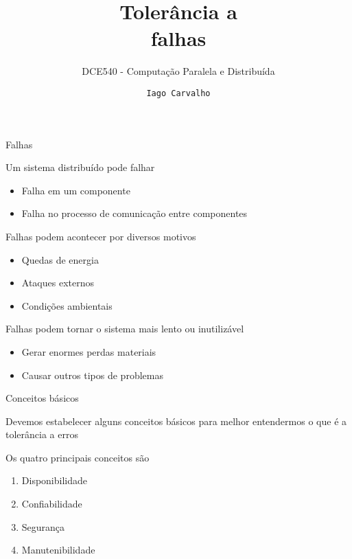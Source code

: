 \documentclass[compress]{beamer}
\title{Tolerância a \\ falhas}
\subtitle{DCE540 - Computação Paralela e Distribuída}
\author{\texttt{Iago Carvalho}}
\institute{\texttt{Departamento de Ciência da Computação}}
\begin{document}
\begin{frame}
\titlepage

\end{frame}


\begin{frame}{Falhas}

Um sistema distribuído pode falhar

\begin{itemize}
    \item Falha em um componente
    \item Falha no processo de comunicação entre componentes
\end{itemize}

\vspace{0.5cm}

Falhas podem acontecer por diversos motivos

\begin{itemize}
    \item Quedas de energia
    \item Ataques externos
    \item Condições ambientais
\end{itemize}

\vspace{0.5cm}

Falhas podem tornar o sistema mais lento ou inutilizável

\begin{itemize}
    \item Gerar enormes perdas materiais
    \item Causar outros tipos de problemas
\end{itemize}

\end{frame}


\begin{frame}{Conceitos básicos}

Devemos estabelecer alguns conceitos básicos para melhor entendermos o que é a tolerância a erros

\vspace{1cm}

Os quatro principais conceitos são
\begin{enumerate}
    \item Disponibilidade
    \item Confiabilidade
    \item Segurança
    \item Manutenibilidade
\end{enumerate}
\end{frame}
\end{document}
